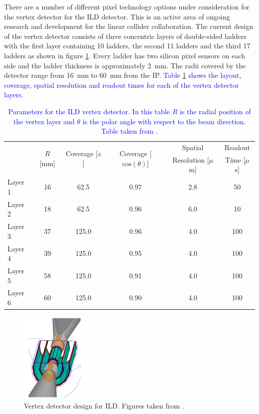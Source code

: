 There are a number of different pixel technology options under consideration for the vertex detector for the ILD detector.  This is an active area of ongoing research and development for the linear collider collaboration.  The current design of the vertex detector consists of three concentric layers of double-sided ladders with the first layer containing 10 ladders, the second 11 ladders and the third 17 ladders as shown in figure \ref{fig:vertexpicture}.  Every ladder has two silicon pixel sensors on each side and the ladder thickness is approximately 2~mm.  The radii covered by the detector range from 16~mm to 60~mm from the IP.  \textcolor{blue}{Table \ref{table:vertexdetectorparam} shows the layout, coverage, spatial resolution and readout times for each of the vertex detector layers}.  

\begin{table}[h!]
\centering
\begin{tabular}{ l c c c c c}
\hline
& \multirow{2}{*}{$R$ [mm]} & \multirow{2}{*}{Coverage [$z$]} & \multirow{2}{*}{Coverage [$\text{cos}(\theta)$]} & Spatial & Readout \\
& & & & Resolution [$\mu$m] & Time [$\mu$s] \\
\hline
Layer 1 & 16 & 62.5 & 0.97 & 2.8 & 50 \\
Layer 2 & 18 & 62.5 & 0.96 & 6.0 & 10 \\
\hline
Layer 3 & 37 & 125.0 & 0.96 & 4.0 & 100 \\
Layer 4 & 39 & 125.0 & 0.95 & 4.0 & 100 \\
\hline
Layer 5 & 58 & 125.0 & 0.91 & 4.0 & 100 \\
Layer 6 & 60 & 125.0 & 0.90 & 4.0 & 100 \\
\hline
\end{tabular}
\caption[Parameters for the ILD vertex detector.  In this table $R$ is the radial position of the vertex layer and $\theta$ is the polar angle with respect to the beam direction.  Table taken from \cite{Behnke:2013lya}.]{\textcolor{blue}{Parameters for the ILD vertex detector.  In this table $R$ is the radial position of the vertex layer and $\theta$ is the polar angle with respect to the beam direction.  Table taken from \cite{Behnke:2013lya}}.}
\label{table:vertexdetectorparam}
\end{table}

\begin{figure}[h!]
\centering
\includegraphics[width=0.3\textwidth]{LCDetectorsAndPFlow/Plots/Pictures/Vertex3.png}
\caption[Vertex detector design for ILD.  Figures taken from \cite{arXiv:1006.3396}.]{Vertex detector design for ILD.  Figures taken from \cite{arXiv:1006.3396}.}
\label{fig:vertexpicture}
\end{figure} 

